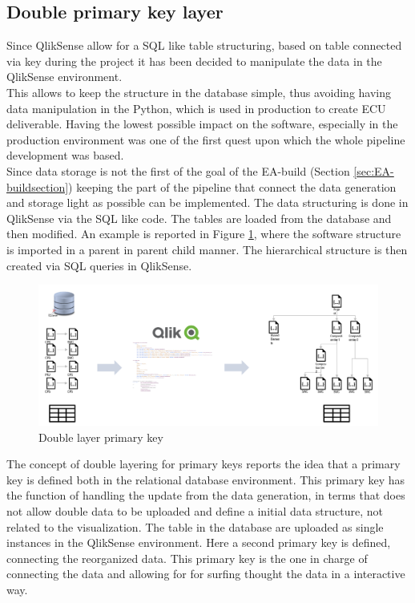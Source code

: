 \documentclass[../main.tex]{subfiles}
\begin{document}
\subsection{Double primary key layer}
Since QlikSense allow for a SQL like table structuring, based on table connected via key during the project it has been decided to manipulate the data in the QlikSense environment.\\
This allows to keep the structure in the database simple, thus avoiding having data manipulation in the Python, which is used in production to create \gls{ECU} deliverable. Having the lowest possible impact on the software, especially in the production environment was one of the first quest upon which the whole pipeline development was based.\\
Since data storage is not the first of the goal of the EA-build (Section \ref{sec:EA-buildsection}) keeping the part of the pipeline that connect the data generation and storage light as possible can be implemented. 
The data structuring is done in QlikSense via the SQL like code. The tables are loaded from the database and then modified. An example is reported in Figure \ref{fig:doublelayer}, where the software structure is imported in a parent in parent child manner. The hierarchical structure is then created via SQL queries in QlikSense.  
\begin{figure}[H]
    \centering
    \includegraphics[width=\linewidth]{images_folder/doublalayer.png}
    \caption{Double layer primary key}
    \label{fig:doublelayer}
\end{figure} 
The concept of double layering for primary keys reports the idea that a primary key is defined both in the relational database environment. This primary key has the function of handling the update from the data generation, in terms that does not allow double data to be uploaded and define a initial data structure, not related to the visualization. The table in the database are uploaded as single instances in the QlikSense environment. Here a second primary key is defined, connecting the reorganized data. This primary key is the one in charge of connecting the data and allowing for for surfing thought the data in a interactive way. 
\end{document}

